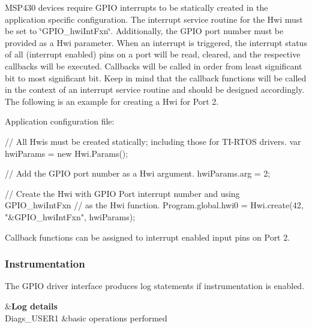 M\+S\+P430 devices require G\+P\+I\+O interrupts to be statically created in the application specific configuration. The interrupt service routine for the Hwi must be set to \char`\"{}\+G\+P\+I\+O\+\_\+hwi\+Int\+Fxn\char`\"{}. Additionally, the G\+P\+I\+O port number must be provided as a Hwi parameter. When an interrupt is triggered, the interrupt status of all (interrupt enabled) pins on a port will be read, cleared, and the respective callbacks will be executed. Callbacks will be called in order from least significant bit to most significant bit. Keep in mind that the callback functions will be called in the context of an interrupt service routine and should be designed accordingly. The following is an example for creating a Hwi for Port 2.

Application configuration file\+: 
\begin{DoxyCode}
\textcolor{comment}{// All Hwis must be created statically; including those for TI-RTOS drivers.}
var hwiParams = \textcolor{keyword}{new} Hwi.Params();

\textcolor{comment}{// Add the GPIO port number as a Hwi argument.}
hwiParams.arg = 2;

\textcolor{comment}{// Create the Hwi with GPIO Port interrupt number and using GPIO\_hwiIntFxn}
\textcolor{comment}{// as the Hwi function.}
Program.global.hwi0 = Hwi.create(42, \textcolor{stringliteral}{"&GPIO\_hwiIntFxn"}, hwiParams);
\end{DoxyCode}


Callback functions can be assigned to interrupt enabled input pins on Port 2.

\subsubsection*{Instrumentation}

The G\+P\+I\+O driver interface produces log statements if instrumentation is enabled.

\begin{TabularC}{2}
\hline
{}&{\bf Log details  }\\
Diags\+\_\+\+U\+S\+E\+R1 &basic operations performed \\
\end{TabularC}


